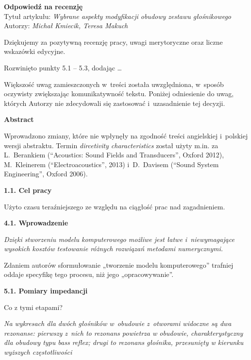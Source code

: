 \documentclass[12pt]{article}
\begin{document}
    
    \begin{center}
        \textbf{Odpowiedź na recenzję }\\
        \vspace{10pt}
        Tytuł artykułu: \textit{Wybrane aspekty modyfikacji obudowy zestawu głośnikowego} \\
        Autorzy: \textit{Michał Kmiecik, Teresa Makuch}
    \end{center}
    

    Dziękujemy za pozytywną recenzję pracy, uwagi merytoryczne oraz liczne wskazówki edycyjne.
    
    Rozwinięto punkty 5.1 -- 5.3, dodając \dots
    
    Większość uwag zamieszczonych w~treści została uwzględniona, w~sposób oczywisty zwiększając komunikatywność tekstu. Poniżej odniesienie do uwag, których Autorzy nie zdecydowali się zastosować i~uzasadnienie tej decyzji.
    
    \textbf{Abstract}
    
    Wprowadzono zmiany, które nie wpłynęły na zgodność treści angielskiej i~polskiej wersji abstraktu. Termin \textit{dircetivity characteristics} został użyty m.in. za L.~Berankiem (\textquotedblleft Acoustics: Sound Fields and Transducers\textquotedblright, Oxford 2012), M.~Kleinerem (\textquotedblleft Electroacoustics\textquotedblright, 2013) i~D.~Davisem (\textquotedblleft Sound System Engineering\textquotedblright, Oxford 2006).
    
    \textbf{1.1. Cel pracy}
    
    Użyto czasu teraźniejszego ze względu na ciągłość prac nad zagadnieniem.
    
    \textbf{4.1. Wprowadzenie}
    
    \textit{Dzięki stworzeniu modelu komputerowego możliwe jest łatwe i~niewymagające wysokich kosztów testowanie różnych rozwiązań metodami numerycznymi.}
    
    Zdaniem autorów sformułowanie „tworzenie modelu komputerowego” trafniej oddaje specyfikę tego procesu, niż jego „opracowywanie”.
    
    \textbf{5.1. Pomiary impedancji}
    
    Co z tymi etapami?
    
    \textit{Na wykresach dla dwóch głośników w~obudowie z~otworami widoczne są dwa rezonanse: pierwszy z~nich to rezonans powietrza w obudowie, charakterystyczny dla obudowy typu \emph{bass reflex}; drugi to rezonans głośnika, przesunięty w kierunku wyższych częstotliwości}
    
\end{document}
